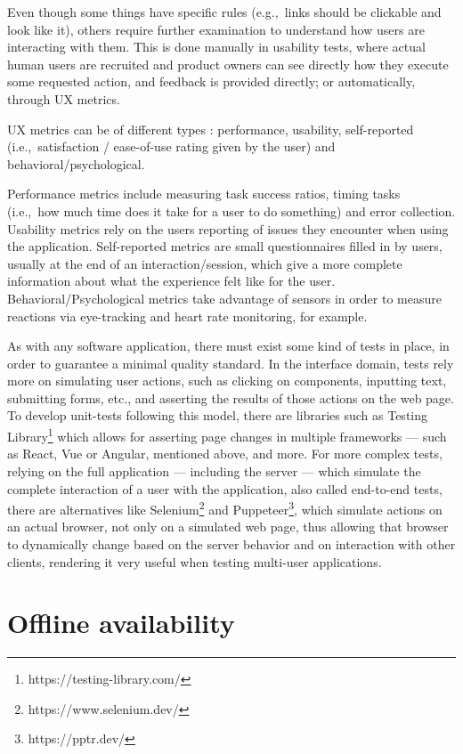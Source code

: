 Even though some things have specific rules (e.g.,\ links should be clickable and look like it), others require further examination to understand how users are interacting with them. This is done manually in usability tests, where actual human users are recruited and product owners can see directly how they execute some requested action, and feedback is provided directly; or automatically, through UX metrics.

UX metrics can be of different types \cite{measuring-user-experience-tullis}: performance, usability, self-reported (i.e.,\ satisfaction / ease-of-use rating given by the user) and behavioral/psychological.

Performance metrics include measuring task success ratios, timing tasks (i.e.,\ how much time does it take for a user to do something) and error collection. Usability metrics rely on the users reporting of issues they encounter when using the application. Self-reported metrics are small questionnaires filled in by users, usually at the end of an interaction/session, which give a more complete information about what the experience felt like for the user. Behavioral/Psychological metrics take advantage of sensors in order to measure reactions via eye-tracking and heart rate monitoring, for example.

As with any software application, there must exist some kind of tests in place, in order to guarantee a minimal quality standard. In the interface domain, tests rely more on simulating user actions, such as clicking on components, inputting text, submitting forms, etc., and asserting the results of those actions on the web page. To develop unit-tests following this model, there are libraries such as Testing Library\footnote{https://testing-library.com/} which allows for asserting page changes in multiple frameworks --- such as React, Vue or Angular, mentioned above, and more. For more complex tests, relying on the full application --- including the server --- which simulate the complete interaction of a user with the application, also called end-to-end tests, there are alternatives like Selenium\footnote{https://www.selenium.dev/} and Puppeteer\footnote{https://pptr.dev/}, which simulate actions on an actual browser, not only on a simulated web page, thus allowing that browser to dynamically change based on the server behavior and on interaction with other clients, rendering it very useful when testing multi-user applications.

\section{Offline availability}\label{sec:offline-avail-sota}


